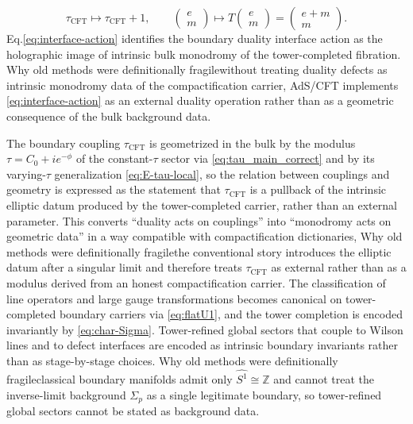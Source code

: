 \documentclass[11pt]{article}
\theoremstyle{remark}
\newcommand{\Z}{\mathbb{Z}}
\begin{document}
\begin{equation}\label{eq:interface-action}
\tau_{\mathrm{CFT}}\mapsto \tau_{\mathrm{CFT}}+1,\qquad \begin{pmatrix}e\\ m\end{pmatrix}\mapsto T\begin{pmatrix}e\\ m\end{pmatrix}=\begin{pmatrix}e+m\\ m\end{pmatrix}.
\end{equation}
Eq.\eqref{eq:interface-action} identifies the boundary duality interface action as the holographic image of intrinsic bulk monodromy of the tower-completed fibration. Why old methods were definitionally fragile\:without treating duality defects as intrinsic monodromy data of the compactification carrier, AdS/CFT implements \eqref{eq:interface-action} as an external duality operation rather than as a geometric consequence of the bulk background data.

The boundary coupling \(\tau_{\mathrm{CFT}}\) is geometrized in the bulk by the modulus \(\tau=C_{0}+ie^{-\phi}\) of the constant-\(\tau\) sector via \eqref{eq:tau_main_correct} and by its varying-\(\tau\) generalization \eqref{eq:E-tau-local}, so the relation between couplings and geometry is expressed as the statement that \(\tau_{\mathrm{CFT}}\) is a pullback of the intrinsic elliptic datum produced by the tower-completed carrier, rather than an external parameter. This converts ``duality acts on couplings'' into ``monodromy acts on geometric data'' in a way compatible with compactification dictionaries, Why old methods were definitionally fragile\:the conventional story introduces the elliptic datum after a singular limit and therefore treats \(\tau_{\mathrm{CFT}}\) as external rather than as a modulus derived from an honest compactification carrier. The classification of line operators and large gauge transformations becomes canonical on tower-completed boundary carriers via \eqref{eq:flatU1}, and the tower completion is encoded invariantly by \eqref{eq:char-Sigma}. Tower-refined global sectors that couple to Wilson lines and to defect interfaces are encoded as intrinsic boundary invariants rather than as stage-by-stage choices. Why old methods were definitionally fragile\:classical boundary manifolds admit only \(\widehat{S^{1}}\cong \Z\) and cannot treat the inverse-limit background \(\Sigma_{p}\) as a single legitimate boundary, so tower-refined global sectors cannot be stated as background data. 
\end{document}
